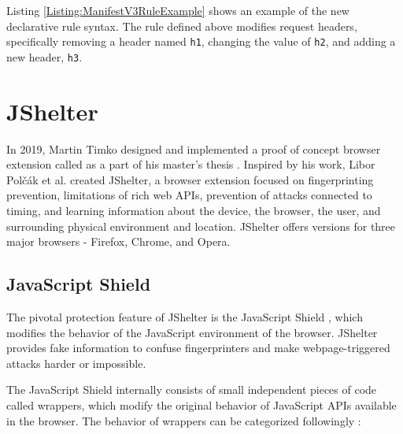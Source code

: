 \medbreak

Listing \ref{Listing:ManifestV3RuleExample} shows an example of the new declarative rule syntax. The rule defined above modifies request headers, specifically removing a header named \texttt{h1}, changing the value of \texttt{h2}, and adding a new header, \texttt{h3}.



\section{JShelter}
\label{Section:JShelter}

In 2019, Martin Timko designed and implemented a proof of concept browser extension called  as a part of his master's thesis \cite{MatejTimkoDP}. Inspired by his work, Libor Polčák et al. \cite{JShelterPaper} created JShelter, a browser extension focused on fingerprinting prevention, limitations of rich web APIs, prevention of attacks connected to timing, and learning information about the device, the browser, the user, and surrounding physical environment and location. JShelter offers versions for three major browsers - Firefox, Chrome, and Opera.

\subsection{JavaScript Shield}

The pivotal protection feature of JShelter is the JavaScript Shield \cite{JShelterJavaScriptShield}, which modifies the behavior of the JavaScript environment of the browser. JShelter provides fake information to confuse fingerprinters and make webpage-triggered attacks harder or impossible.

The JavaScript Shield internally consists of small independent pieces of code called wrappers, which modify the original behavior of JavaScript APIs available in the browser. The behavior of wrappers can be categorized followingly \cite{JShelterJavaScriptShield}:

